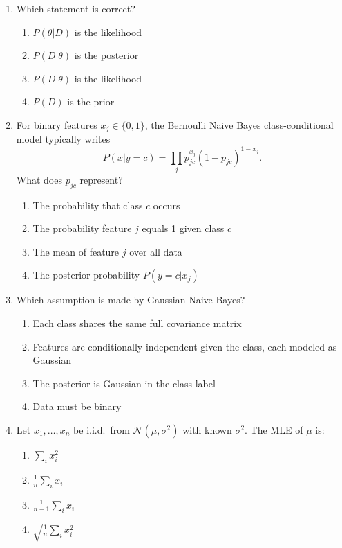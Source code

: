 \documentclass[11pt]{article}
\newcommand{\cmark}{\ding{51}}
\begin{document}
\begin{enumerate}[leftmargin=*]
\item Which statement is correct?

\begin{enumerate}[label=\Alph*.]
    \item $P(\theta|D)$ is the likelihood
    \item $P(D|\theta)$ is the posterior
    \item $P(D|\theta)$ is the likelihood \cmark
    \item $P(D)$ is the prior
\end{enumerate}

\item For binary features $x_j \in \{0,1\}$, the Bernoulli Naive Bayes class-conditional model typically writes
\[
P(x|y=c)=\prod_j p_{jc}^{x_j}(1-p_{jc})^{1-x_j}.
\]
What does $p_{jc}$ represent?

\begin{enumerate}[label=\Alph*.]
    \item The probability that class $c$ occurs
    \item The probability feature $j$ equals 1 given class $c$ \cmark
    \item The mean of feature $j$ over all data
    \item The posterior probability $P(y=c|x_j)$
\end{enumerate}

\item Which assumption is made by Gaussian Naive Bayes?

\begin{enumerate}[label=\Alph*.]
    \item Each class shares the same full covariance matrix
    \item Features are conditionally independent given the class, each modeled as Gaussian \cmark
    \item The posterior is Gaussian in the class label
    \item Data must be binary
\end{enumerate}

\item Let $x_1,\dots,x_n$ be i.i.d.\ from $\mathcal N(\mu,\sigma^2)$ with known $\sigma^2$. The MLE of $\mu$ is:

\begin{enumerate}[label=\Alph*.]
    \item $\sum_i x_i^2$
    \item $\frac{1}{n}\sum_i x_i$ \cmark
    \item $\frac{1}{n-1}\sum_i x_i$
    \item $\sqrt{\frac{1}{n}\sum_i x_i^2}$
\end{enumerate}


\end{enumerate}
\end{document}

